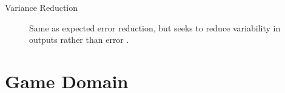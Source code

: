 \documentclass{sig-alternate}
\begin{document}
\begin{description}
\item[Variance Reduction] Same as expected error reduction, but seeks to reduce variability in outputs rather than error \cite{settles2012:al-book}.
\end{description}



\section{Game Domain}
\end{document}
